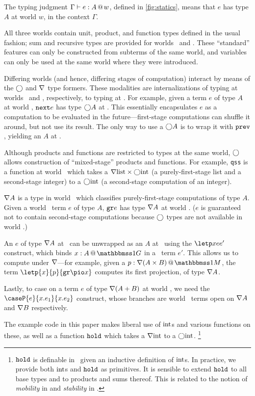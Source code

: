 \begin{abstrsyn}

The typing judgment $\Gamma{} \vdash {e}:{A}~\hspace{-0.15em}\text{@}\hspace{-0.2em}~w$, defined in \ref{fig:statics}, means that
$e$ has type $A$ at world $w$, in the context $\Gamma$. 

All three worlds contain unit, product, and function types defined in the usual fashion;
sum and recursive types are provided for worlds \bbonep\ and \bbtwo.
These ``standard'' features can only be constructed from subterms of the same world,
and variables can only be used at the same world where they were introduced.

Differing worlds (and hence, differing stages of computation) interact by means
of the $\bigcirc$ and $\nabla$ type formers.  These modalities are internalizations
of typing at worlds \bbtwo\ and \bbonep, respectively, to typing at \bbonep.
For example, given a term $e$ of type $A$ at world \bbtwo, 
${\tt next}{e}$ has type $\bigcirc A$ at \bbonem. This essentially
encapsulates $e$ as a computation to be evaluated in the future---first-stage
computations can shuffle it around, but not use its result.  The only way to use
a $\bigcirc A$ is to wrap it with ${\tt prev}$, yielding an $A$ at \bbtwo.

Although products and functions are restricted to types at the same world,
$\bigcirc$ allows construction of ``mixed-stage'' products and functions.
For example, \texttt{qss} is a function at world \bbonem\ which takes a
$\nabla{\rm list} \times \bigcirc{\rm int}$ (a purely-first-stage list and a
second-stage integer) to a $\bigcirc{\rm int}$ (a second-stage
computation of an integer).

$\nabla A$ is a type in world \bbonem\ which classifies purely-first-stage
computations of type $A$. Given a world \bbonep\ term $e$ of type $A$,
${\tt gr}{e}$ has type $\nabla A$ at world \bbonem. ($e$ is guaranteed not to contain
second-stage computations because $\bigcirc$ types are not available in world
\bbonep.)

An $e$ of type $\nabla A$ at \bbonem\ can be unwrapped as an $A$ at \bbonep\
using the $\letp xe{e'}$ construct, which binds $\colpure xA$ in a \bbonem\ term
$e'$. This allows us to compute under $\nabla$---for example, given a $\colmix
p{\curr(A\times B)}$, the term $\letp{x}{p}{\pure{\pio x}}$ computes its first
projection, of type $\nabla A$.

Lastly, to case on a term $e$ of type $\nabla(A+B)$ at world \bbonem, we need the
$\caseP{e}{x.e_1}{x.e_2}$ construct, whose branches are world \bbonem\ terms
open on $\nabla{A}$ and $\nabla{B}$ respectively.

The example code in this paper makes liberal use of ${\rm int}$s and various
functions on these, as well as a function ${\tt hold}$ which takes a $\nabla{\rm int}$
to a $\bigcirc{\rm int}$.%
\footnote{${\tt hold}$ is definable in \lang\ given an inductive definition of
${\rm int}$s. In practice, we provide both ${\rm int}$s and ${\tt hold}$ as primitives.
It is sensible to extend ${\tt hold}$ to all base types and to products and sums
thereof. This is related to the notion of {\em mobility} in \cite{murphy05} and
{\em stability} in \cite{krishnaswami13}.}

\end{abstrsyn}


